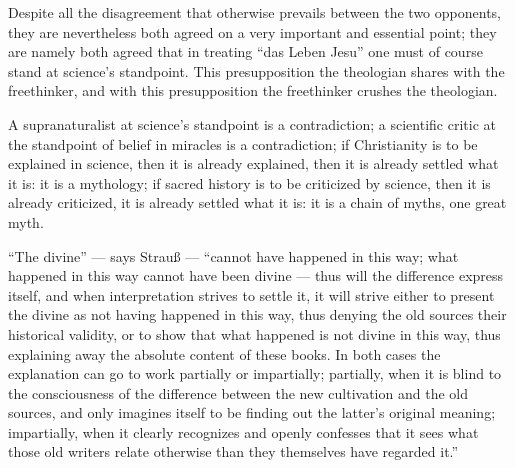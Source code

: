 \documentclass[12pt,a4paper]{book}
\begin{document}
Despite all the disagreement that otherwise prevails between the two opponents, they are
nevertheless both agreed on a very important and essential point; they are namely both
agreed that in treating ``das Leben Jesu'' one must of course stand at science's
standpoint. This presupposition the theologian shares with the freethinker, and with this
presupposition the freethinker crushes the theologian.

A supranaturalist at science's standpoint is a contradiction; a scientific critic at the
standpoint of belief in miracles is a contradiction; if Christianity is to be explained in
science, then it is already explained, then it is already settled what it is: it is a
mythology; if sacred history is to be criticized by science, then it is already
criticized, it is already settled what it is: it is a chain of myths, one great myth.

``The divine'' --- says Strauß --- ``cannot have happened in this way; what happened in
this way cannot have been divine --- thus will the difference express itself, and when
interpretation strives to settle it, it will strive either to present the divine as not
having happened in this way, thus denying the old sources their historical validity, or to
show that what happened
is not divine in this way, thus explaining away the absolute content of these books. In
both cases the explanation can go to work partially or impartially; partially, when it is
blind to the consciousness of the difference between the new cultivation and the old
sources, and only imagines itself to be finding out the latter's original meaning;
impartially, when it clearly recognizes and openly confesses that it sees what those old
writers relate otherwise than they themselves have regarded it.''
\end{document}
